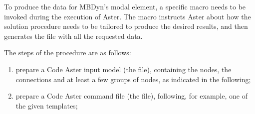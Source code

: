 To produce the data for MBDyn's modal element, a specific macro 
needs to be invoked during the execution of Aster.
The macro instructs Aster about how the solution procedure
needs to be tailored to produce the desired results, and then
generates the  file with all the requested data.

The steps of the procedure are as follows:
\begin{enumerate} %

\item prepare a Code Aster input model (the  file),
containing the nodes, the connections and at least a few groups
of nodes, as indicated in the following;

\item prepare a Code Aster command file (the  file),
following, for example, one of the given templates;


\end{enumerate}

